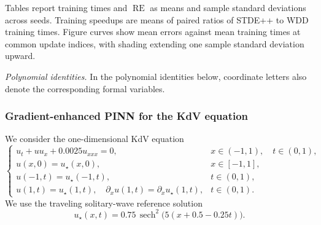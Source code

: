 \documentclass[final,oneeqnum]{siamltex}
\begin{document}
Tables report training times and $\operatorname{RE}$ as means and sample standard deviations across seeds.
Training speedups are means of paired ratios of STDE++ to WDD training times.
Figure curves show mean errors against mean training times at common update indices, with shading extending one sample standard deviation upward.

\emph{Polynomial identities.}
In the polynomial identities below, coordinate letters also denote the corresponding formal variables.

\subsubsection{Gradient-enhanced PINN for the KdV equation}\label{sec_num_pinn}

We consider the one-dimensional KdV equation
\begin{equation}\label{eq_num_kdv}
    \begin{cases}
        u_t + u u_x + 0.0025 u_{xxx} = 0,                                            & x \in (-1, 1), \quad t \in (0, 1), \\
        u(x, 0) = u_\star(x, 0),                                                    & x \in [-1, 1],                     \\
        u(-1, t) = u_\star(-1, t),                                                  & t \in (0, 1),                      \\
        u(1, t) = u_\star(1, t), \quad \partial_x u(1, t) = \partial_x u_\star(1, t), & t \in (0, 1).
    \end{cases}
\end{equation}
We use the traveling solitary-wave reference solution
\begin{equation}\label{eq_num_soliton}
    u_\star(x, t) = 0.75 \, \operatorname{sech}^{2} \bigl(5 (x + 0.5 - 0.25 t)\bigr).
\end{equation}
\end{document}
